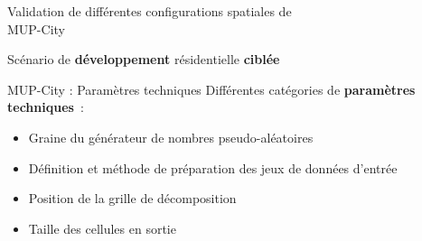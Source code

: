 \documentclass[xcolor=table]{beamer}
\begin{document}
\begin{frame}{Validation de différentes configurations spatiales de \\MUP-City}
{\begin{block}{Scénario de \textbf{développement} résidentielle \textbf{ciblée}}
	\end{block}}
\end{frame}

\begin{frame}{MUP-City : Paramètres techniques}
	Différentes catégories de \textbf{paramètres techniques}~:\\
	\begin{itemize}
		\item Graine du générateur de nombres pseudo-aléatoires
		\item Définition et méthode de préparation des jeux de données d'entrée
		\item Position de la grille de décomposition
		\item Taille des cellules en sortie
	\end{itemize}
\end{frame}
\end{document}
